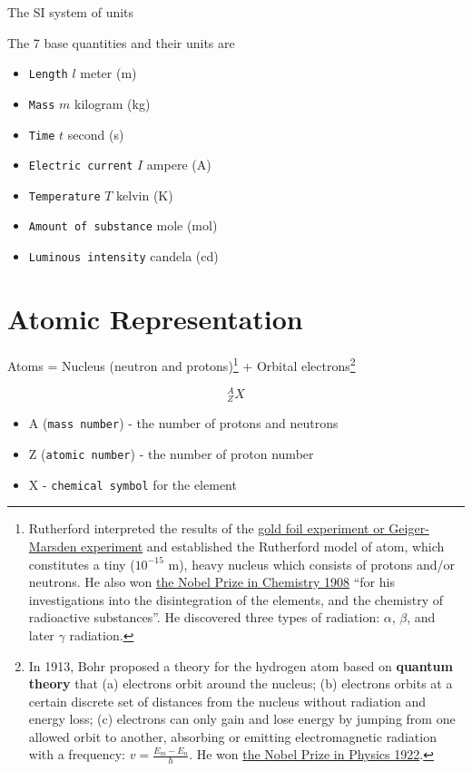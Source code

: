\documentclass[]{book}
\providecommand{\tightlist}{%
  \setlength{\itemsep}{0pt}\setlength{\parskip}{0pt}}
\let\rmarkdownfootnote\footnote%
\def\footnote{\protect\rmarkdownfootnote}
\theoremstyle{definition}
\theoremstyle{definition}
\theoremstyle{definition}
\theoremstyle{remark}
\begin{document}
The SI system of units

The 7 base quantities and their units are

\begin{itemize}
\tightlist
\item
  \texttt{Length} \(l\) meter (m)
\item
  \texttt{Mass} \(m\) kilogram (kg)
\item
  \texttt{Time} \(t\) second (s)
\item
  \texttt{Electric\ current} \(I\) ampere (A)
\item
  \texttt{Temperature} \(T\) kelvin (K)
\item
  \texttt{Amount\ of\ substance} mole (mol)
\item
  \texttt{Luminous\ intensity} candela (cd)
\end{itemize}

\section{Atomic Representation}\label{atomic-rep}

Atoms = Nucleus (neutron and protons)\footnote{Rutherford interpreted
  the results of the
  \href{https://en.wikipedia.org/wiki/Geiger\%E2\%80\%93Marsden_experiment}{gold
  foil experiment or Geiger-Marsden experiment} and established the
  Rutherford model of atom, which constitutes a tiny (\(10^{-15}\) m),
  heavy nucleus which consists of protons and/or neutrons. He also won
  \href{https://www.nobelprize.org/nobel_prizes/chemistry/laureates/1908/}{the
  Nobel Prize in Chemistry 1908} ``for his investigations into the
  disintegration of the elements, and the chemistry of radioactive
  substances''. He discovered three types of radiation: \(\alpha\),
  \(\beta\), and later \(\gamma\) radiation.} + Orbital
electrons\footnote{In 1913, Bohr proposed a theory for the hydrogen atom
  based on \textbf{quantum theory} that (a) electrons orbit around the
  nucleus; (b) electrons orbits at a certain discrete set of distances
  from the nucleus without radiation and energy loss; (c) electrons can
  only gain and lose energy by jumping from one allowed orbit to
  another, absorbing or emitting electromagnetic radiation with a
  frequency: \(v=\frac{E_m-E_n}{h}\). He won
  \href{https://www.nobelprize.org/nobel_prizes/physics/laureates/1922/}{the
  Nobel Prize in Physics 1922}.}

\[^A_ZX\]

\begin{itemize}
\tightlist
\item
  A (\texttt{mass\ number}) - the number of protons and neutrons
\item
  Z (\texttt{atomic\ number}) - the number of proton number
\item
  X - \texttt{chemical\ symbol} for the element
\end{itemize}
\end{document}
